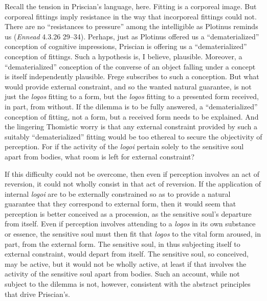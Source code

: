 \documentclass[12pt]{article}
\begin{document}
Recall the tension in Priscian's language, here. Fitting is a corporeal image. But corporeal fittings imply resistance in the way that incorporeal fittings could not. There are no ``resistances to pressure'' among the intelligible as Plotinus reminds us (\emph{Ennead} 4.3.26 29--34). Perhaps, just as Plotinus offered us a ``dematerialized'' conception of cognitive impressions, Priscian is offering us a ``dematerialized'' conception of fittings. Such a hypothesis is, I believe, plausible. Moreover, a ``dematerialized'' conception of the converse of an object falling under a concept is itself independently plausible. Frege subscribes to such a conception. But what would provide external constraint, and so the wanted natural guarantee, is not just the \emph{logos} fitting to a form, but the \emph{logos} fitting to a presented form received, in part, from without. If the dilemma is to be fully answered, a ``dematerialized'' conception of fitting, not a form, but a received form needs to be explained. And the lingering Thomistic worry is that any external constraint provided by such a suitably ``dematerialized'' fitting would be too ethereal to secure the objectivity of perception. For if the activity of the \emph{logoi} pertain solely to the sensitive soul apart from bodies, what room is left for external constraint? 

If this difficulty could not be overcome, then even if perception involves an act of reversion, it could not wholly consist in that act of reversion. If the application of internal \emph{logoi} are to be externally constrained so as to provide a natural guarantee that they correspond to external form, then it would seem that perception is better conceived as a procession, as the sensitive soul's departure from itself. Even if perception involves attending to a \emph{logos} in its own substance or essence, the sensitive soul must then fit that \emph{logos} to the vital form aroused, in part, from the external form. The sensitive soul, in thus subjecting itself to external constraint, would depart from itself. The sensitive soul, so conceived, may be active, but it would not be wholly active, at least if that involves the activity of the sensitive soul apart from bodies. Such an account, while not subject to the dilemma is not, however, consistent with the abstract principles that drive Priscian's.
\end{document}
